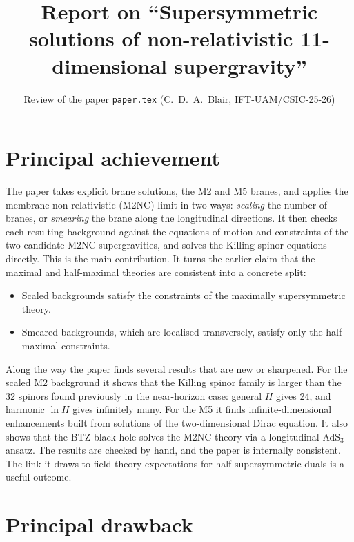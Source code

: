 \documentclass[11pt]{article}
\title{Report on ``Supersymmetric solutions of non-relativistic 11-dimensional supergravity''}
\author{Review of the paper \texttt{paper.tex} (C.~D.~A.~Blair, IFT-UAM/CSIC-25-26)}
\date{}
\begin{document}
\maketitle

\section{Principal achievement}

The paper takes explicit brane solutions, the M2 and M5 branes, and applies the membrane non-relativistic (M2NC) limit in two ways: \emph{scaling} the number of branes, or \emph{smearing} the brane along the longitudinal directions. It then checks each resulting background against the equations of motion and constraints of the two candidate M2NC supergravities, and solves the Killing spinor equations directly. This is the main contribution. It turns the earlier claim that the maximal and half-maximal theories are consistent into a concrete split:
\begin{itemize}
  \item Scaled backgrounds satisfy the constraints of the maximally supersymmetric theory.
  \item Smeared backgrounds, which are localised transversely, satisfy only the half-maximal constraints.
\end{itemize}
Along the way the paper finds several results that are new or sharpened. For the scaled M2 background it shows that the Killing spinor family is larger than the 32 spinors found previously in the near-horizon case: general $H$ gives 24, and harmonic $\ln H$ gives infinitely many. For the M5 it finds infinite-dimensional enhancements built from solutions of the two-dimensional Dirac equation. It also shows that the BTZ black hole solves the M2NC theory via a longitudinal AdS${}_3$ ansatz. The results are checked by hand, and the paper is internally consistent. The link it draws to field-theory expectations for half-supersymmetric duals is a useful outcome.

\section{Principal drawback}
\end{document}
